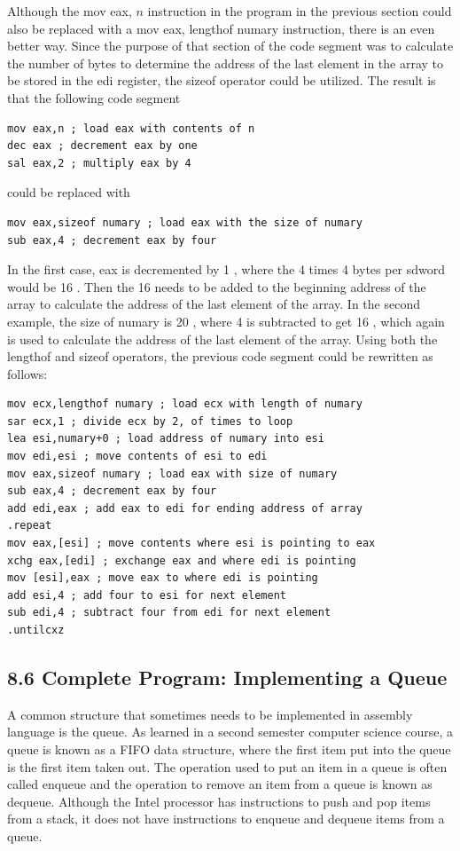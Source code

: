 \documentclass[10pt]{book}
\begin{document}
\begin{center}
\begin{center}
\begin{center}
Although the mov eax, $n$ instruction in the program in the previous section could also be replaced with a mov eax, lengthof numary instruction, there is an even better way. Since the purpose of that section of the code segment was to calculate the number of bytes to determine the address of the last element in the array to be stored in the edi register, the sizeof operator could be utilized. The result is that the following code segment

\begin{verbatim}
mov eax,n ; load eax with contents of n
dec eax ; decrement eax by one
sal eax,2 ; multiply eax by 4
\end{verbatim}

could be replaced with

\begin{verbatim}
mov eax,sizeof numary ; load eax with the size of numary
sub eax,4 ; decrement eax by four
\end{verbatim}

In the first case, eax is decremented by 1 , where the 4 times 4 bytes per sdword would be 16 . Then the 16 needs to be added to the beginning address of the array to calculate the address of the last element of the array. In the second example, the size of numary is 20 , where 4 is subtracted to get 16 , which again is used to calculate the address of the last element of the array. Using both the lengthof and sizeof operators, the previous code segment could be rewritten as follows:


\begin{verbatim}
mov ecx,lengthof numary ; load ecx with length of numary
sar ecx,1 ; divide ecx by 2, of times to loop
lea esi,numary+0 ; load address of numary into esi
mov edi,esi ; move contents of esi to edi
mov eax,sizeof numary ; load eax with size of numary
sub eax,4 ; decrement eax by four
add edi,eax ; add eax to edi for ending address of array
.repeat
mov eax,[esi] ; move contents where esi is pointing to eax
xchg eax,[edi] ; exchange eax and where edi is pointing
mov [esi],eax ; move eax to where edi is pointing
add esi,4 ; add four to esi for next element
sub edi,4 ; subtract four from edi for next element
.untilcxz
\end{verbatim}

\subsection*{8.6 Complete Program: Implementing a Queue}
A common structure that sometimes needs to be implemented in assembly language is the queue. As learned in a second semester computer science course, a queue is known as a FIFO data structure, where the first item put into the queue is the first item taken out. The operation used to put an item in a queue is often called enqueue and the operation to remove an item from a queue is known as dequeue. Although the Intel processor has instructions to push and pop items from a stack, it does not have instructions to enqueue and dequeue items from a queue.


\end{center}
\end{center}
\end{center}
\end{document}
